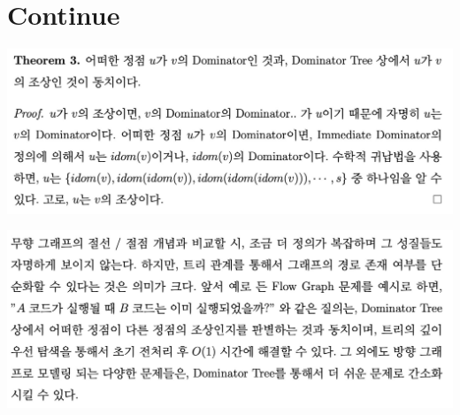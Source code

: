 \section{Continue}
\begin{minipage}{90mm}
\includegraphics[width=\textwidth]{content/various/d3}
\end{minipage}
\begin{minipage}{90mm}
\includegraphics[width=\textwidth]{content/various/d4}
\end{minipage}

